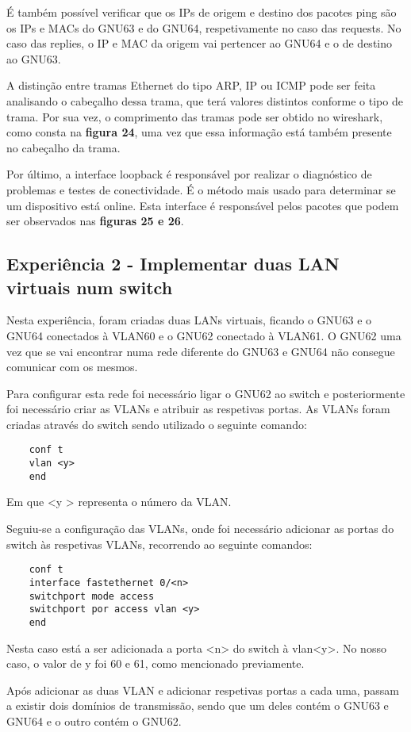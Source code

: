 \documentclass[article, a4paper, 11pt, oneside]{memoir}
\begin{document}
É também possível verificar que os IPs de origem e destino dos pacotes ping são os IPs e MACs do GNU63 e do GNU64, respetivamente no caso das requests.
No caso das replies, o IP e MAC da origem vai pertencer ao GNU64 e o de destino ao GNU63.

A distinção entre tramas Ethernet do tipo ARP, IP ou ICMP pode ser feita analisando o cabeçalho dessa trama, que terá valores distintos conforme o tipo de trama.
Por sua vez, o comprimento das tramas pode ser obtido no wireshark, como consta na \textbf{figura 24}, uma vez que essa informação está também presente no cabeçalho da trama.

Por último, a interface loopback é responsável por realizar o diagnóstico de problemas e testes de conectividade.
É o método mais usado para determinar se um dispositivo está online. Esta interface é responsável pelos pacotes que podem
ser observados nas \textbf{figuras 25 e 26}.


\subsection{Experiência 2 - Implementar duas LAN virtuais num switch}

Nesta experiência, foram criadas duas LANs virtuais, ficando o GNU63 e o GNU64 conectados à VLAN60 e o GNU62 conectado à VLAN61.
O GNU62 uma vez que se vai encontrar numa rede diferente do GNU63 e GNU64 não consegue comunicar com os mesmos.


Para configurar esta rede foi necessário ligar o GNU62 ao switch e posteriormente foi necessário criar as VLANs e atribuir as respetivas portas.
As VLANs foram criadas através do switch sendo utilizado o seguinte comando:
\begin{lstlisting}
	conf t
	vlan <y>
	end
\end{lstlisting} 
Em que \textless y \textgreater{} representa o número da VLAN.

Seguiu-se a configuração das VLANs, onde foi necessário adicionar as portas do switch às respetivas VLANs, recorrendo ao seguinte comandos:
\begin{lstlisting}
	conf t
	interface fastethernet 0/<n>
	switchport mode access
	switchport por access vlan <y>
	end
\end{lstlisting} 
Nesta caso está a ser adicionada a porta \textless n\textgreater{} do switch à vlan\textless y\textgreater{}. No nosso caso, o valor de y foi 60 e 61, 
como mencionado previamente.

Após adicionar as duas VLAN e adicionar respetivas portas a cada uma, 
passam a existir dois domínios de transmissão, sendo que um deles contém o GNU63 e GNU64 e o outro contém o GNU62.
\end{document}
